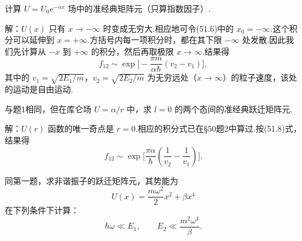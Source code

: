 \begin{xiti}

\quad 计算 $U=U_0\mathrm{e}^{-\alpha x}$ 场中的准经典矩阵元（只算指数因子）.

解：$U(x)$ 只有 $x\to-\infty$ 时变成无穷大.相应地可令(51.6)中的 $x_0=-\infty$.这个积分可以延伸到 $x=+\infty$.方括号内每一项积分时，都在其下限 $-\infty$ 处发散.因此我们先计算从 $-x$ 到 $+\infty$ 的积分，然后再取极限 $x\to\infty$.结果得
\begin{equation*}
  f_{12}\sim\exp\bigg[-\frac{\pi m}{\alpha\hbar}(v_2-v_1)\bigg],
\end{equation*}
其中的 $v_1=\sqrt{2E_1/m}$，$v_2=\sqrt{2E_2/m}$ 为无穷远处（$x\to\infty$）的粒子速度，该处的运动是自由运动.

\quad 与题1相同，但在库仑场 $U=\alpha/r$ 中，求 $l=0$ 的两个态间的准经典跃迁矩阵元.

解：$U(r)$ 函数的唯一奇点是 $r=0$.相应的积分式已在§50题2中算过.按(51.8)式，结果得
\begin{equation*}
  f_{12}\sim\exp\bigg[\frac{\pi\alpha}{\hbar}
  \left(\frac{1}{v_2}-\frac{1}{v_1}\right)\bigg].
\end{equation*}

\quad 同第一题，求非谐振子的跃迁矩阵元，其势能为
\begin{equation*}
  U(x)=\frac{m\omega^2}{2}x^2+\beta x^4
\end{equation*}
在下列条件下计算：
\setcounter{equation}{0}\renewcommand{\theequation}{\arabic{equation}}%
\begin{equation}
  \hbar\omega\ll E_1,\qquad E_2\ll\frac{m^2\omega^4}{\beta}.
\end{equation}


\end{xiti}
